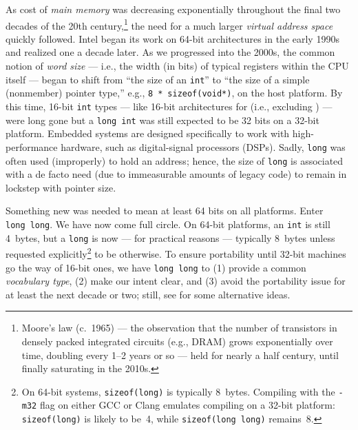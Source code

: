 \noindent As cost of \emph{main memory} was decreasing exponentially
throughout the final two decades of the 20th
century,{\cprotect\footnote{Moore's law (c.~1965) --- the observation
that the number of transistors in densely packed integrated circuits
(e.g., DRAM) grows exponentially over time, doubling every 1--2 years
or so --- held for nearly a half century, until finally saturating in
  the 2010s.}} the need for a much larger \emph{virtual address space}
quickly followed. Intel began its work on 64-bit architectures in the
early 1990s and realized one a decade later. As we progressed into
the 2000s, the common notion of \emph{word size} --- i.e., the width (in
bits) of typical registers within the CPU itself --- began to shift from
``the size of an \lstinline!int!'' to ``the size of a simple (nonmember)
pointer type,'' e.g., \lstinline!8!~\lstinline!*!~\lstinline!sizeof(void*)!, on the host platform. By this time, 16-bit \lstinline!int! types --- like 16-bit architectures for  (i.e., excluding ) --- were long gone but a \lstinline!long!~\lstinline!int! was still expected to be 32 bits on a 32-bit platform. Embedded systems are designed specifically to work with high-performance hardware, such as digital-signal processors (DSPs). Sadly,
\lstinline!long! was often used (improperly) to hold an address; hence,
the size of \lstinline!long! is associated with a de facto need (due to immeasurable amounts of legacy code) to remain in lockstep with pointer size.

Something new was needed to mean at least 64 bits on all platforms.
Enter \lstinline!long!~\lstinline!long!. We have now come full circle. On
64-bit platforms, an \lstinline!int! is still 4~bytes, but a \lstinline!long!
is now --- for practical reasons --- typically 8~bytes unless requested
explicitly{\cprotect\footnote{On 64-bit systems, \lstinline!sizeof(long)!
is typically 8~bytes. Compiling with the \lstinline!-m32! flag on either
GCC or Clang emulates compiling on a 32-bit platform:
\lstinline!sizeof(long)! is likely to be~4, while
  \lstinline!sizeof(long!~\lstinline!long)! remains~8.}} to be otherwise. To ensure portability until 32-bit machines go the way of 16-bit ones,
we have \lstinline!long!~\lstinline!long! to (1) provide a common \emph{vocabulary type}, (2)
make our intent clear, and (3) avoid the portability issue for
at least the next decade or two; still, see 
for some alternative ideas.



